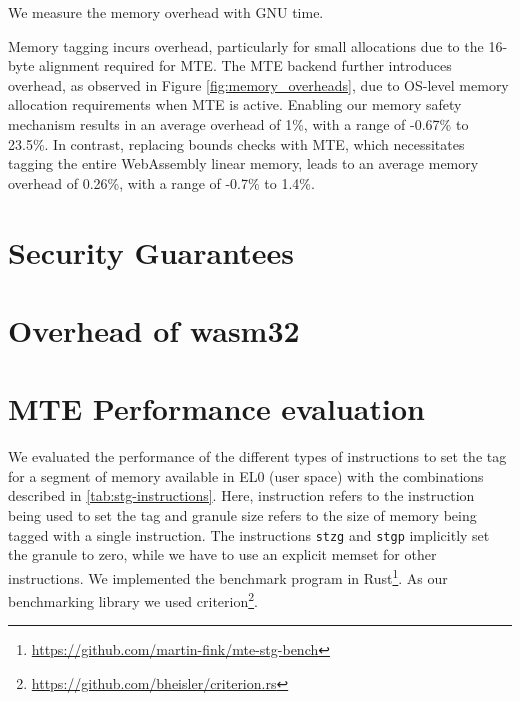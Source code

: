 We measure the memory overhead with GNU time.

Memory tagging incurs overhead, particularly for small allocations due to the 16-byte alignment required for MTE.
The MTE backend further introduces overhead, as observed in Figure \ref{fig:memory_overheads}, due to OS-level memory allocation requirements when MTE is active.
Enabling our memory safety mechanism results in an average overhead of 1\%, with a range of -0.67\% to 23.5\%.
In contrast, replacing bounds checks with MTE, which necessitates tagging the entire WebAssembly linear memory, leads to an average memory overhead of 0.26\%, with a range of -0.7\% to 1.4\%.


\section{Security Guarantees}\label{sec:security-guarantees}




\section{Overhead of wasm32}
\label{sec:eval-wasm32-wasm64}



\section{MTE Performance evaluation}
\label{sec:mte-performance-evaluation}

We evaluated the performance of the different types of instructions to set the tag for a segment of memory available in EL0 (user space) with the combinations described in \cref{tab:stg-instructions}.
Here, instruction refers to the instruction being used to set the tag and granule size refers to the size of memory being tagged with a single instruction.
The instructions \texttt{stzg} and \texttt{stgp} implicitly set the granule to zero, while we have to use an explicit memset for other instructions.
We implemented the benchmark program in Rust\footnote{\url{https://github.com/martin-fink/mte-stg-bench}}.
As our benchmarking library we used criterion\footnote{\url{https://github.com/bheisler/criterion.rs}}.


